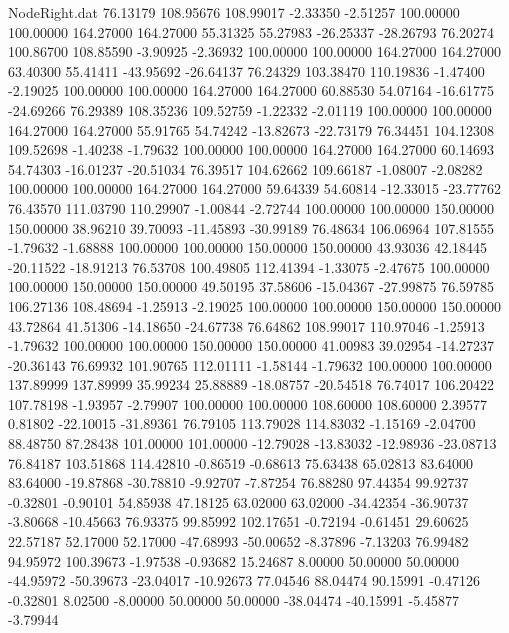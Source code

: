 \begin{filecontents}{NodeRight.dat}
  76.13179  108.95676  108.99017    -2.33350   -2.51257  100.00000  100.00000  164.27000  164.27000   55.31325   55.27983  -26.25337  -28.26793
  76.20274  100.86700  108.85590    -3.90925   -2.36932  100.00000  100.00000  164.27000  164.27000   63.40300   55.41411  -43.95692  -26.64137
  76.24329  103.38470  110.19836    -1.47400   -2.19025  100.00000  100.00000  164.27000  164.27000   60.88530   54.07164  -16.61775  -24.69266
  76.29389  108.35236  109.52759    -1.22332   -2.01119  100.00000  100.00000  164.27000  164.27000   55.91765   54.74242  -13.82673  -22.73179
  76.34451  104.12308  109.52698    -1.40238   -1.79632  100.00000  100.00000  164.27000  164.27000   60.14693   54.74303  -16.01237  -20.51034
  76.39517  104.62662  109.66187    -1.08007   -2.08282  100.00000  100.00000  164.27000  164.27000   59.64339   54.60814  -12.33015  -23.77762
  76.43570  111.03790  110.29907    -1.00844   -2.72744  100.00000  100.00000  150.00000  150.00000   38.96210   39.70093  -11.45893  -30.99189
  76.48634  106.06964  107.81555    -1.79632   -1.68888  100.00000  100.00000  150.00000  150.00000   43.93036   42.18445  -20.11522  -18.91213
  76.53708  100.49805  112.41394    -1.33075   -2.47675  100.00000  100.00000  150.00000  150.00000   49.50195   37.58606  -15.04367  -27.99875
  76.59785  106.27136  108.48694    -1.25913   -2.19025  100.00000  100.00000  150.00000  150.00000   43.72864   41.51306  -14.18650  -24.67738
  76.64862  108.99017  110.97046    -1.25913   -1.79632  100.00000  100.00000  150.00000  150.00000   41.00983   39.02954  -14.27237  -20.36143
  76.69932  101.90765  112.01111    -1.58144   -1.79632  100.00000  100.00000  137.89999  137.89999   35.99234   25.88889  -18.08757  -20.54518
  76.74017  106.20422  107.78198    -1.93957   -2.79907  100.00000  100.00000  108.60000  108.60000    2.39577    0.81802  -22.10015  -31.89361
  76.79105  113.79028  114.83032    -1.15169   -2.04700   88.48750   87.28438  101.00000  101.00000  -12.79028  -13.83032  -12.98936  -23.08713
  76.84187  103.51868  114.42810    -0.86519   -0.68613   75.63438   65.02813   83.64000   83.64000  -19.87868  -30.78810   -9.92707   -7.87254
  76.88280   97.44354   99.92737    -0.32801   -0.90101   54.85938   47.18125   63.02000   63.02000  -34.42354  -36.90737   -3.80668  -10.45663
  76.93375   99.85992  102.17651    -0.72194   -0.61451   29.60625   22.57187   52.17000   52.17000  -47.68993  -50.00652   -8.37896   -7.13203
  76.99482   94.95972  100.39673    -1.97538   -0.93682   15.24687    8.00000   50.00000   50.00000  -44.95972  -50.39673  -23.04017  -10.92673
  77.04546   88.04474   90.15991    -0.47126   -0.32801    8.02500   -8.00000   50.00000   50.00000  -38.04474  -40.15991   -5.45877   -3.79944

\end{filecontents}
